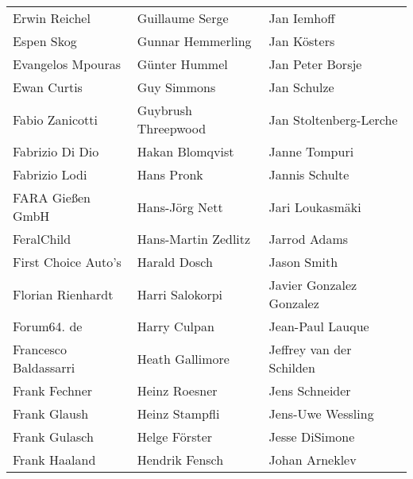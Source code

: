 \begin{tabular}{p{4.5cm}p{4.5cm}p{4.5cm}}
Erwin Reichel & Guillaume Serge & Jan Iemhoff \\
Espen Skog & Gunnar Hemmerling & Jan Kösters \\
Evangelos Mpouras & Günter Hummel & Jan Peter Borsje \\
Ewan Curtis & Guy Simmons & Jan Schulze \\
Fabio Zanicotti & Guybrush Threepwood & Jan Stoltenberg-Lerche \\
Fabrizio Di Dio & Hakan Blomqvist & Janne Tompuri \\
Fabrizio Lodi & Hans Pronk & Jannis Schulte \\
FARA Gießen GmbH & Hans-Jörg Nett & Jari Loukasmäki \\
FeralChild & Hans-Martin Zedlitz & Jarrod Adams \\
First Choice Auto's & Harald Dosch & Jason Smith \\
Florian Rienhardt & Harri Salokorpi & Javier Gonzalez Gonzalez \\
Forum64. de & Harry Culpan & Jean-Paul Lauque \\
Francesco Baldassarri & Heath Gallimore & Jeffrey van der Schilden \\
Frank Fechner & Heinz Roesner & Jens Schneider \\
Frank Glaush & Heinz Stampfli & Jens-Uwe Wessling \\
Frank Gulasch & Helge Förster & Jesse DiSimone \\
Frank Haaland & Hendrik Fensch & Johan Arneklev \\
\end{tabular}
\newpage
\setlength{\tabcolsep}{1mm}
